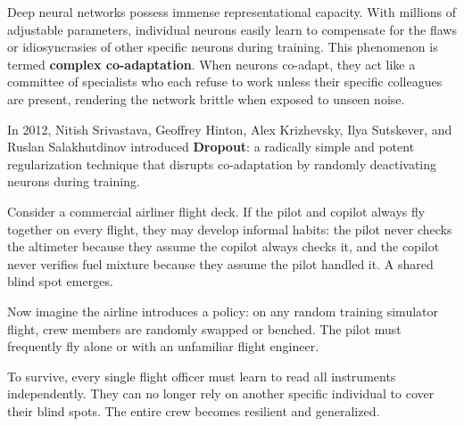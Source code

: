 Deep neural networks possess immense representational capacity. With millions of adjustable parameters, individual neurons easily learn to compensate for the flaws or idiosyncrasies of other specific neurons during training. This phenomenon is termed \textbf{complex co-adaptation}. When neurons co-adapt, they act like a committee of specialists who each refuse to work unless their specific colleagues are present, rendering the network brittle when exposed to unseen noise.

In 2012, Nitish Srivastava, Geoffrey Hinton, Alex Krizhevsky, Ilya Sutskever, and Ruslan Salakhutdinov introduced \textbf{Dropout}: a radically simple and potent regularization technique that disrupts co-adaptation by randomly deactivating neurons during training.

\begin{analogy}
Consider a commercial airliner flight deck. If the pilot and copilot always fly together on every flight, they may develop informal habits: the pilot never checks the altimeter because they assume the copilot always checks it, and the copilot never verifies fuel mixture because they assume the pilot handled it. A shared blind spot emerges.

Now imagine the airline introduces a policy: on any random training simulator flight, crew members are randomly swapped or benched. The pilot must frequently fly alone or with an unfamiliar flight engineer. 

To survive, every single flight officer must learn to read all instruments independently. They can no longer rely on another specific individual to cover their blind spots. The entire crew becomes resilient and generalized.
\end{analogy}

